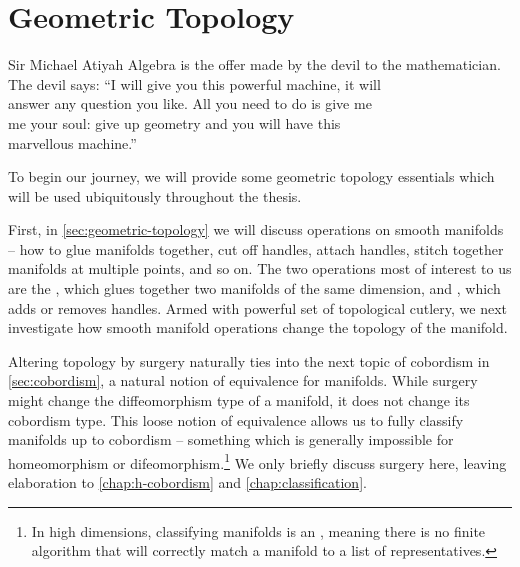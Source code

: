\chapter{Geometric Topology}\label{chap:fundamentals}

%
%

\begin{epigraph}{27em}{Sir Michael Atiyah}
	Algebra is the offer made by the devil to the mathematician.\\
	The devil says: ``I will give you this powerful machine, it will\\
	answer any question you like. All you need to do is give me\\
	me your soul: give up geometry and you will have this \\
	marvellous machine.''
\end{epigraph}

\noindent
To begin our journey, we will provide some geometric topology essentials which will be used ubiquitously throughout the thesis.

First, in \cref{sec:geometric-topology} we will discuss operations on smooth manifolds -- how to glue manifolds together, cut off handles, attach handles, stitch together manifolds at multiple points, and so on. The two operations most of interest to us are the , which glues together two manifolds of the same dimension, and , which adds or removes handles. 
Armed with powerful set of topological cutlery, we next investigate how smooth manifold operations change the topology of the manifold.

Altering topology by surgery naturally ties into the next topic of cobordism in \cref{sec:cobordism}, a natural notion of equivalence for manifolds. While surgery might change the diffeomorphism type of a manifold, it does not change its cobordism type. This loose notion of equivalence allows us to fully classify manifolds up to cobordism -- something which is generally impossible for homeomorphism or difeomorphism.\footnote{In high dimensions, classifying manifolds is an , meaning there is no finite algorithm that will correctly match a manifold to a list of representatives.} We only briefly discuss surgery here, leaving elaboration to \cref{chap:h-cobordism} and \cref{chap:classification}.

